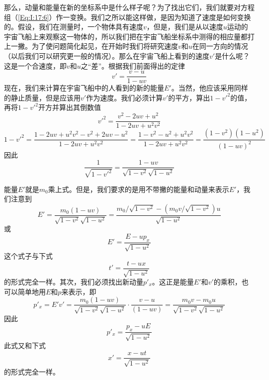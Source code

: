 那么，动量和能量在新的坐标系中是什么样子呢？为了找出它们，我们就要对方程组（\ref{Eq:I:17:6}）作一变换。我们之所以能这样做，是因为知道了速度是如何变换的。假设，我们在测量时，一个物体具有速度$v$，但是，我们是从以速度$u$运动的宇宙飞船上来观察这一物体的，所以我们把在宇宙飞船坐标系中测得的相应量都打上一撇。为了使问题简化起见，在开始时我们将研究速度$v$和$u$在同一方向的情况（以后我们可以研究更一般的情况）。那么在宇宙飞船上看到的速度$v'$是什么呢？这是一个合速度，即$v$和$u$之“差”。根据我们前面得出的定律
\begin{equation}
    \label{Eq:I:17:8}
    v'=\frac{v-u}{1-uv}
\end{equation}
现在，我们来计算在宇宙飞船中的人看到的新的能量$E'$。当然，他应该采用同样的静止质量，但是应该用$v'$作为速度。我们必须计算$v'$的平方，算出$1-v'^2$的值，再将$1-v'^2$开方并算出其倒数值
\begin{equation*}
    v'^2=\frac{v^2-2uv+u^2}{1-2uv+u^2v^2}
\end{equation*}
\begin{equation*}
    1-v'^2=\frac{1-2uv+u^2v^2-v^2+2uv-u^2}{1-2uv+u^2v^2}=\frac{1-v^2-u^2+u^2v^2}{1-2uv+u^2v^2}=\frac{(1-v^2)(1-u^2)}{(1-uv)^2}
\end{equation*}
因此
\begin{equation}
    \label{Eq:I:17:9}
    \frac{1}{\sqrt{1-v'^2}}=\frac{1-uv}{\sqrt{1-v^2}\sqrt{1-u^2}}
\end{equation}

能量$E'$就是$m_0$乘上式。但是，我们要求的是用不带撇的能量和动量来表示$E'$，我们注意到
\begin{equation*}
    E'=\frac{m_0(1-uv)}{\sqrt{1-v^2}\sqrt{1-u^2}}=\frac{m_0/\sqrt{1-v^2}-(m_0v/\sqrt{1-v^2})u}{\sqrt{1-u^2}}
\end{equation*}
或
\begin{equation}
    \label{Eq:I:17:10}
    E'=\frac{E-up_x}{\sqrt{1-u^2}}
\end{equation}
这个式子与下式
\begin{equation*}
    t'=\frac{t-ux}{\sqrt{1-u^2}}
\end{equation*}
的形式完全一样。其次，我们必须找出新动量$p'_x$。这正是能量$E'$和$v'$的乘积，也可以简单地用$E$和$p$来表示，即
\begin{equation*}
    p'_x=E'v'=\frac{m_0(1-uv)}{\sqrt{1-v^2}\sqrt{1-u^2}} \cdot \frac{v-u}{(1-uv)}=\frac{m_0v-m_0u}{\sqrt{1-v^2}\sqrt{1-u^2}}
\end{equation*}
因此
\begin{equation}
    \label{Eq:I:17:11}
    p'_x=\frac{p_x-uE}{\sqrt{1-u^2}}
\end{equation}
此式又和下式
\begin{equation*}
    x'=\frac{x-ut}{\sqrt{1-u^2}}
\end{equation*}
的形式完全一样。

